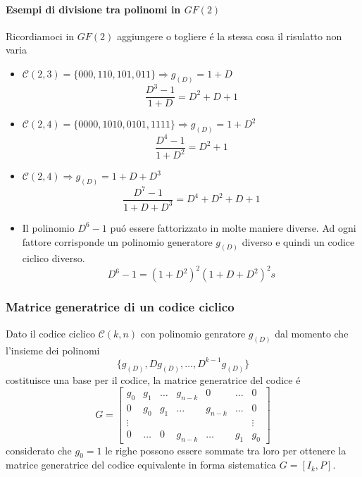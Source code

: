             \paragraph{Esempi di divisione tra polinomi in $GF(2)$}
                Ricordiamoci in $GF(2)$ aggiungere o togliere é la stessa cosa il risulatto non varia
                \begin{itemize}
                    \item {
                        $\mathcal{C}(2,3) = \{000,110,101,011\} \Rightarrow g_{(D)} = 1+D$
                        \[
                            \frac{D^3-1}{1+D} = D^2+D+1
                        \]
                    }
                    \item {
                        $\mathcal{C}(2,4) = \{0000,1010,0101,1111\} \Rightarrow g_{(D)} = 1+D^2$
                        \[
                            \frac{D^4-1}{1+D^2} = D^2+1
                        \]
                    }
                    \item {
                        $\mathcal{C}(2,4) \Rightarrow g_{(D)} = 1+D+D^3$
                        \[
                            \frac{D^7-1}{1+D+D^3} = D^4+D^2+D+1
                        \]
                    }
                    \item {
                        Il polinomio $D^6-1$ puó essere fattorizzato in molte maniere diverse. Ad ogni fattore corrisponde un polinomio
                        generatore $g_{(D)}$ diverso e quindi un codice ciclico diverso.
                        \[
                            D^6-1 = (1+D^2)^2(1+D+D^2)^2s
                        \]
                    }
                \end{itemize}
        \subsubsection{Matrice generatrice di un codice ciclico}
            Dato il codice ciclico $\mathcal{C}(k,n)$ con polinomio genratore $g_{(D)}$ dal momento che l'insieme dei polinomi
            \[
                \{g_{(D)},Dg_{(D)},\dots,D^{k-1}g_{(D)}\}  
            \]
            costituisce una base per il codice, la matrice generatrice del codice é 
            \[
                G = 
                \begin{bmatrix}
                g_0 & g_1 & \dots & g_{n-k} & 0 & \dots & 0\\ 
                0 & g_0 & g_1 & \dots & g_{n-k} & \dots & 0\\ 
                \vdots &  &  &  &  &  & \vdots\\ 
                0 & \dots & 0 & g_{n-k} & \dots & g_1 & g_0
                \end{bmatrix}
            \]
            considerato che $g_0 = 1$ le righe possono essere sommate tra loro per ottenere la matrice generatrice del codice 
            equivalente in forma sistematica $G = [I_k,P]$.
